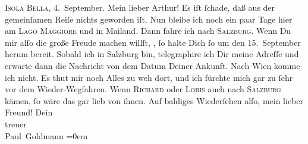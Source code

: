 \begin{ledgroupsized}[t]{13cm}
           \pstart
           \centering{}\textsc{Isola Bella}, 4. September. \pend
           \pstart\center{}Mein lieber Arthur!\pend\pstart
           Es iſt ſchade, daß aus der gemeinſamen Reiſe nichts geworden iſt. Nun bleibe ich noch
               ein paar Tage hier am \textsc{Lago Maggiore} und in Mailand. Dann fahre ich nach \textsc{Salzburg}. Wenn Du mir alſo die große Freude machen willſt, \label{K_L02714-1v}\label{K_L02714-1h}, ſo halte Dich ſo um den 15. September herum
               bereit. {\pb}Sobald ich in Salzburg bin, telegraphire ich Dir meine Adreſſe und \strikeout{\textcolor{gray}{×}} erwarte dann die Nachricht von dem Datum Deiner Ankunft. Nach Wien komme ich nicht. Es thut mir noch Alles zu weh dort, und
               ich fürchte mich gar zu ſehr vor dem Wieder-Wegfahren. Wenn \textsc{Richard} oder \textsc{Loris} auch nach \textsc{Salzburg} kämen, ſo wäre das gar lieb von ihnen.\pend
           \pstart
           Auf baldiges Wiederſehen alſo, mein lieber Freund!\pend
           \pstart
           Dein {\\[\baselineskip]}treuer {\\[\baselineskip]}\spacefill\mbox{Paul Goldmann}\pend
           \leftskip=0em{}
         
         \endnumbering{}\end{ledgroupsized}  \newcommand{\dateiname}{L02714}\newcommand{\titel}{Paul Goldmann an Arthur Schnitzler, 4. 9. [1893]}\newcommand{\editorInnen}{Martin Anton Müller und Laura Untner}
      
